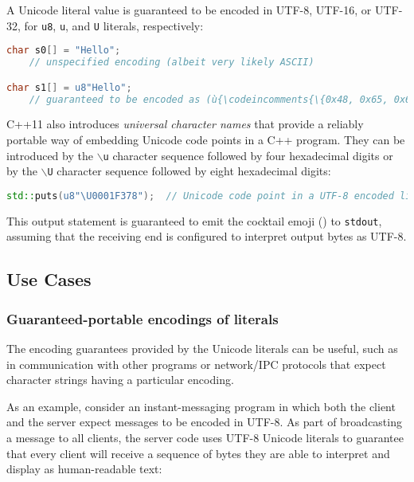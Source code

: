 \noindent A Unicode literal value is guaranteed to be encoded in UTF-8, UTF-16, or
UTF-32, for \texttt{u8}, \texttt{u}, and \texttt{U} literals,
respectively:

\begin{lstlisting}[language=C++]
char s0[] = "Hello";
    // unspecified encoding (albeit very likely ASCII)

char s1[] = u8"Hello";
    // guaranteed to be encoded as (ù{\codeincomments{\{0x48, 0x65, 0x6C, 0x6C, 0x6F, 0x0\}}}ù)
\end{lstlisting}

\noindent C++11 also introduces \emph{universal character names} that provide a
reliably portable way of embedding Unicode code points in a C++ program.
They can be introduced by the \texttt{$\backslash$u} character
sequence followed by four hexadecimal digits or by the
\texttt{$\backslash$U} character sequence followed by eight
hexadecimal digits:

\begin{lstlisting}[language=C++]
std::puts(u8"\U0001F378");  // Unicode code point in a UTF-8 encoded literal
\end{lstlisting}

\noindent This output statement is guaranteed to emit the cocktail emoji
(\martini) to \texttt{stdout}, assuming that the receiving end is configured to
interpret output bytes as UTF-8.

\subsection[Use Cases]{Use Cases}\label{use-cases}

\subsubsection[Guaranteed-portable encodings of literals]{Guaranteed-portable encodings of literals}\label{guaranteed-portable-encodings-of-literals}

The encoding guarantees provided by the Unicode literals can be useful,
such as in communication with other programs or network/IPC protocols that
expect character strings having a particular encoding.

As an example, consider an instant-messaging program in which both the
client and the server expect messages to be encoded in UTF-8. As part of
broadcasting a message to all clients, the server code uses UTF-8
Unicode literals to guarantee that every client will receive a sequence
of bytes they are able to interpret and display as human-readable text:

